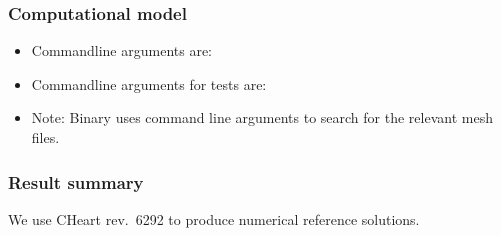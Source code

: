 \subsubsection{Computational model}
%
\begin{itemize}
    \item{Commandline arguments are:}
    \item{Commandline arguments for tests are:}
    \item{Note: Binary uses command line arguments to search for the relevant mesh files.}
\end{itemize}
%
%
\subsubsection{Result summary}
%
We use CHeart rev.\ 6292 to produce numerical reference solutions.
%


%
%
